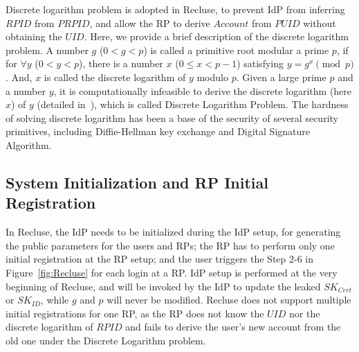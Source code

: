 Discrete logarithm problem is adopted in Recluse, to prevent IdP from inferring $RPID$ from $PRPID$, and allow the RP to derive $Account$ from $PUID$ without obtaining the $UID$. 
Here, we provide a brief description of the discrete logarithm problem.
A number $g$ ($0<g<p$) is called a primitive root modular a prime $p$, if for ${\forall}y$ ($0<y<p$), there is a  number $x$ ($0\le x <p-1$) satisfying $y=g^x \pmod p$. 
And, $x$ is called the discrete logarithm of $y$ modulo $p$. Given a large prime $p$ and a number $y$, it is computationally infeasible to derive the discrete logarithm (here $x$) of $y$ (detailed in~\cite{WXWM}), which is called  Discrete Logarithm Problem. The hardness of solving discrete logarithm has been a base of the security of several security primitives, including Diffie-Hellman key exchange and Digital Signature Algorithm.

\subsection{System Initialization and RP Initial Registration}
In Recluse, the IdP needs to be initialized during the IdP setup, for generating the public parameters for the users and RPs; the RP has to perform only one initial registration at the RP setup; and  the user triggers the Step 2-6 in Figure~\ref{fig:Recluse} for each login at a RP. IdP setup is performed at the very beginning of Recluse, and will be invoked by the IdP to update the leaked $SK_{Cert}$ or $SK_{ID}$, while $g$ and $p$ will never be modified. Recluse does not support multiple initial registrations for one RP, as the RP does not know the $UID$ nor the discrete logarithm of $RPID$ and fails to derive the user's new account from the old one under the Discrete Logarithm problem.


